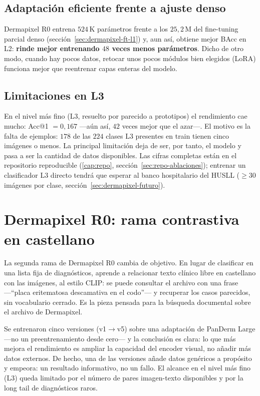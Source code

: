 \subsection{Adaptación eficiente frente a ajuste denso}

Dermapixel R0 entrena $524$\,K parámetros frente a los $25{,}2$\,M del
fine-tuning parcial denso (sección~\ref{sec:dermapixel-ft-l1}) y, aun
así, obtiene mejor BAcc en L2: \textbf{rinde mejor entrenando $48$ veces
menos parámetros}. Dicho de otro modo, cuando hay pocos datos, retocar
unos pocos módulos bien elegidos (LoRA) funciona mejor que reentrenar
capas enteras del modelo.

\subsection{Limitaciones en L3}

En el nivel más fino (L3, resuelto por parecido a prototipos) el
rendimiento cae mucho: Acc@1 $= 0{,}167$ ---aún así, $42$ veces mejor que
el azar---. El motivo es la falta de ejemplos: $178$ de las $224$ clases
L3 presentes en train tienen cinco imágenes o menos. La principal
limitación deja de ser, por tanto, el modelo y pasa a ser la cantidad de
datos disponibles. Las cifras completas están en el repositorio
reproducible (\ref{cap:repo}, sección~\ref{sec:repo-ablaciones}); entrenar
un clasificador L3 directo tendrá que esperar al banco hospitalario del
HUSLL ($\geq 30$ imágenes por clase,
sección~\ref{sec:dermapixel-futuro}).

\section{Dermapixel R0: rama contrastiva en castellano}
\label{sec:spanderm-clip}

La segunda rama de Dermapixel R0 cambia de objetivo. En lugar de
clasificar en una lista fija de diagnósticos, aprende a relacionar
texto clínico libre en castellano con las imágenes, al estilo CLIP: se
puede consultar el archivo con una frase ---``placa eritematosa
descamativa en el codo''--- y recuperar los casos parecidos, sin
vocabulario cerrado. Es la pieza pensada para la búsqueda documental
sobre el archivo de Dermapixel.

Se entrenaron cinco versiones (v1$\to$v5) sobre una adaptación de
PanDerm Large ---no un preentrenamiento desde cero--- y la conclusión
es clara: lo que más mejora el rendimiento es ampliar la capacidad del
encoder visual, no añadir más datos externos. De hecho, una de
las versiones añade datos genéricos a propósito y empeora: un
resultado informativo, no un fallo. El alcance en el nivel más fino
(L3) queda limitado por el número de pares imagen-texto disponibles y
por la long tail de diagnósticos raros.

